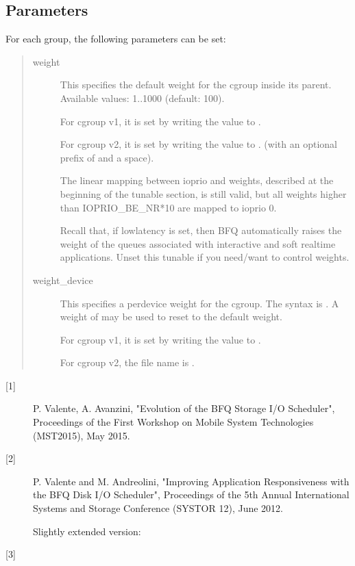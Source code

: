 \documentclass[a4paper,11pt,english]{sphinxmanual}
\begin{document}
\subsection{Parameters}
\label{\detokenize{bfq-iosched:parameters}}
For each group, the following parameters can be set:
\begin{quote}
\begin{description}
\item[{weight}] \leavevmode
This specifies the default weight for the cgroup inside its parent.
Available values: 1..1000 (default: 100).

For cgroup v1, it is set by writing the value to .

For cgroup v2, it is set by writing the value to .
(with an optional prefix of  and a space).

The linear mapping between ioprio and weights, described at the beginning
of the tunable section, is still valid, but all weights higher than
IOPRIO\_BE\_NR*10 are mapped to ioprio 0.

Recall that, if low\sphinxhyphen{}latency is set, then BFQ automatically raises the
weight of the queues associated with interactive and soft real\sphinxhyphen{}time
applications. Unset this tunable if you need/want to control weights.

\item[{weight\_device}] \leavevmode
This specifies a per\sphinxhyphen{}device weight for the cgroup. The syntax is
. A weight of  may be used to reset to the default
weight.

For cgroup v1, it is set by writing the value to .

For cgroup v2, the file name is .

\end{description}
\end{quote}
\begin{description}
\item[{{[}1{]}}] \leavevmode
P. Valente, A. Avanzini, "Evolution of the BFQ Storage I/O
Scheduler", Proceedings of the First Workshop on Mobile System
Technologies (MST\sphinxhyphen{}2015), May 2015.


\item[{{[}2{]}}] \leavevmode
P. Valente and M. Andreolini, "Improving Application
Responsiveness with the BFQ Disk I/O Scheduler", Proceedings of
the 5th Annual International Systems and Storage Conference
(SYSTOR \textquotesingle{}12), June 2012.

Slightly extended version:


\item[{{[}3{]}}] \leavevmode
{}

\end{description}
\end{document}
